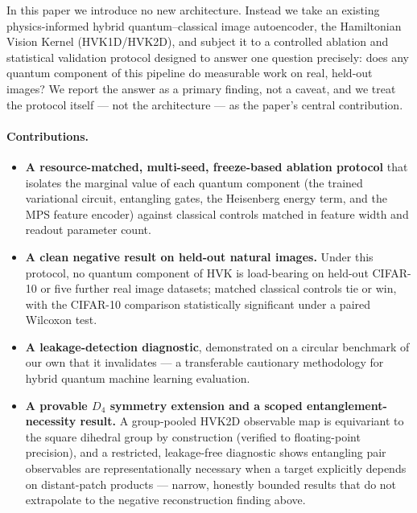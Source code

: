 \documentclass[journal]{IEEEtran}
\begin{document}
In this paper we introduce no new architecture. Instead we take an existing physics-informed hybrid quantum--classical image autoencoder, the Hamiltonian Vision Kernel (HVK1D/HVK2D), and subject it to a controlled ablation and statistical validation protocol designed to answer one question precisely: does any quantum component of this pipeline do measurable work on real, held-out images? We report the answer as a primary finding, not a caveat, and we treat the protocol itself --- not the architecture --- as the paper's central contribution.

\paragraph{Contributions.}
\begin{itemize}
    \item \textbf{A resource-matched, multi-seed, freeze-based ablation protocol} that isolates the marginal value of each quantum component (the trained variational circuit, entangling gates, the Heisenberg energy term, and the MPS feature encoder) against classical controls matched in feature width and readout parameter count.
    \item \textbf{A clean negative result on held-out natural images.} Under this protocol, no quantum component of HVK is load-bearing on held-out CIFAR-10 or five further real image datasets; matched classical controls tie or win, with the CIFAR-10 comparison statistically significant under a paired Wilcoxon test.
    \item \textbf{A leakage-detection diagnostic}, demonstrated on a circular benchmark of our own that it invalidates --- a transferable cautionary methodology for hybrid quantum machine learning evaluation.
    \item \textbf{A provable $D_4$ symmetry extension and a scoped entanglement-necessity result.} A group-pooled HVK2D observable map is equivariant to the square dihedral group by construction (verified to floating-point precision), and a restricted, leakage-free diagnostic shows entangling pair observables are representationally necessary when a target explicitly depends on distant-patch products --- narrow, honestly bounded results that do not extrapolate to the negative reconstruction finding above.
\end{itemize}
\end{document}

